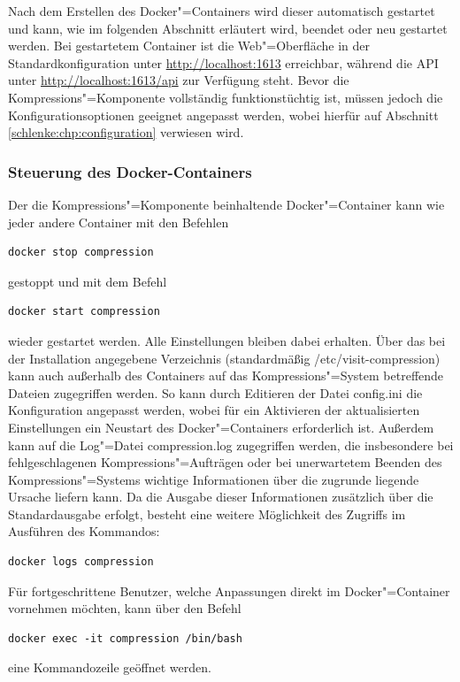 Nach dem Erstellen des Docker"=Containers wird dieser automatisch gestartet und kann, wie im folgenden Abschnitt erläutert wird, beendet oder neu gestartet werden. Bei gestartetem Container ist die Web"=Oberfläche in der Standardkonfiguration unter \url{http://localhost:1613} erreichbar, während die API unter \url{http://localhost:1613/api} zur Verfügung steht. Bevor die Kompressions"=Komponente vollständig funktionstüchtig ist, müssen jedoch die Konfigurationsoptionen geeignet angepasst werden, wobei hierfür auf Abschnitt \ref{schlenke:chp:configuration} verwiesen wird.

\subsubsection{Steuerung des Docker-Containers}

Der die Kompressions"=Komponente beinhaltende Docker"=Container kann wie jeder andere Container mit den Befehlen
\begin{lstlisting}[caption={Kommando zum Beenden des Docker-Containers der Kompressions-Komponente},label=schlenke:lst:dockerstop]
docker stop compression
\end{lstlisting}
gestoppt und mit dem Befehl
\begin{lstlisting}[caption={Kommando zum Starten des Docker-Containers der Kompressions-Komponente}]
docker start compression
\end{lstlisting}
wieder gestartet werden. Alle Einstellungen bleiben dabei erhalten. Über das bei der Installation angegebene Verzeichnis (standardmäßig {\ttfamily /etc/visit-compression}) kann auch außerhalb des Containers auf das Kompressions"=System betreffende Dateien zugegriffen werden. So kann durch Editieren der Datei {\ttfamily config.ini} die Konfiguration angepasst werden, wobei für ein Aktivieren der aktualisierten Einstellungen ein Neustart des Docker"=Containers erforderlich ist. Außerdem kann auf die Log"=Datei {compression.log} zugegriffen werden, die insbesondere bei fehlgeschlagenen Kompressions"=Aufträgen oder bei unerwartetem Beenden des Kompressions"=Systems wichtige Informationen über die zugrunde liegende Ursache liefern kann. Da die Ausgabe dieser Informationen zusätzlich über die Standardausgabe erfolgt, besteht eine weitere Möglichkeit des Zugriffs im Ausführen des Kommandos:
\begin{lstlisting}[caption={Kommando zum Anzeigen der Ausgaben des Kompressions-Systems}]
docker logs compression
\end{lstlisting}
Für fortgeschrittene Benutzer, welche Anpassungen direkt im Docker"=Container vornehmen möchten, kann über den Befehl
\begin{lstlisting}[caption={Befehl zum Öffnen einer Kommandozeile im Kompressions-Container}]
docker exec -it compression /bin/bash
\end{lstlisting}
eine Kommandozeile geöffnet werden.

